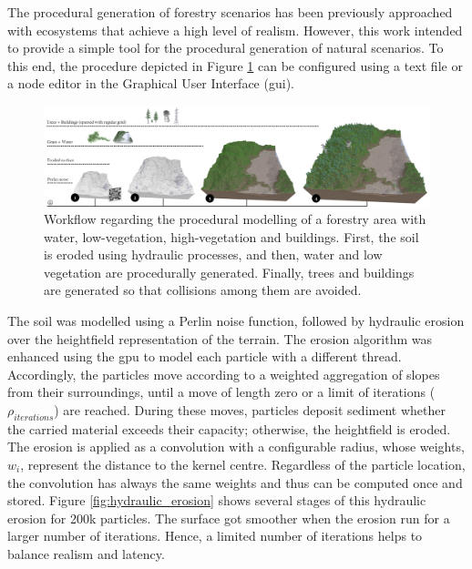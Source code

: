 The procedural generation of forestry scenarios has been previously approached with ecosystems \cite{cordonnier_authoring_2017, fischer_autobiomes_2020, makowski_synthetic_2019} that achieve a high level of realism. However, this work intended to provide a simple tool for the procedural generation of natural scenarios. To this end, the procedure depicted in Figure \ref{fig:procedural_workflow} can be configured using a text file or a node editor in the Graphical User Interface (\acrshort{gui}).

\begin{figure}
    \centering
    \includegraphics[width=\linewidth]{figs/lidar_simulation/procedural_workflow.png}
	\caption{Workflow regarding the procedural modelling of a forestry area with water, low-vegetation, high-vegetation and buildings. First, the soil is eroded using hydraulic processes, and then, water and low vegetation are procedurally generated. Finally, trees and buildings are generated so that collisions among them are avoided. }
	\label{fig:procedural_workflow}
\end{figure}

The soil was modelled using a Perlin noise function, followed by hydraulic erosion over the heightfield representation of the terrain. The erosion algorithm was enhanced using the \acrshort{gpu} to model each particle with a different thread. Accordingly, the particles move according to a weighted aggregation of slopes from their surroundings, until a move of length zero or a limit of iterations ($\rho_{\textit{iterations}}$) are reached. During these moves, particles deposit sediment whether the carried material exceeds their capacity; otherwise, the heightfield is eroded. The erosion is applied as a convolution with a configurable radius, whose weights, $w_i$, represent the distance to the kernel centre. Regardless of the particle location, the convolution has always the same weights and thus can be computed once and stored. Figure \ref{fig:hydraulic_erosion} shows several stages of this hydraulic erosion for 200k particles. The surface got smoother when the erosion run for a larger number of iterations. Hence, a limited number of iterations helps to balance realism and latency. 

